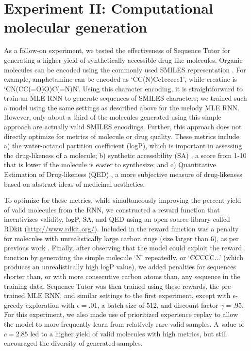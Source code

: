 \section{Experiment II: Computational molecular generation} As a follow-on experiment, we tested the effectiveness of Sequence Tutor for generating a higher yield of synthetically accessible drug-like molecules. Organic molecules can be encoded using the commonly used SMILES representation \cite{weininger1970smiles}. For example, amphetamine can be encoded as `CC(N)Cc1ccccc1', while creatine is `CN(CC(=O)O)C(=N)N'. Using this character encoding, it is straightforward to train an MLE RNN to generate sequences of SMILES characters; we trained such a model using the same settings as described above for the melody MLE RNN. However, only about a third of the molecules generated using this simple approach are actually valid SMILES encodings. Further, this approach does not directly optimize for metrics of molecule or drug quality. These metrics include: a) the water-octanol partition coefficient (logP), which is important in assessing the drug-likeness of a molecule; b) synthetic accessibility (SA) \cite{ertl2009estimation}, a score from 1-10 that is lower if the molecule is easier to synthesize; and c) Quantitative Estimation of Drug-likeness (QED) \cite{bickerton2012quantifying}, a more subjective measure of drug-likeness based on abstract ideas of medicinal aesthetics. 

To optimize for these metrics, while simultaneously improving the percent yield of valid molecules from the RNN, we constructed a reward function that incentivizes validity, logP, SA, and QED using an open-source library called RDkit (\url{http://www.rdkit.org/}). Included in the reward function was a penalty for molecules with unrealistically large carbon rings (size larger than 6), as per previous work \cite{gomez2016automatic}. Finally, after observing that the model could exploit the reward function by generating the simple molecule `N' repeatedly, or `CCCCC...' (which produces an unrealistically high logP value), we added penalties for sequences shorter than, or with more consecutive carbon atoms than, any sequence in the training data. Sequence Tutor was then trained using these rewards, the pre-trained MLE RNN, and similar settings to the first experiment, except with $\epsilon$-greedy exploration with $\epsilon=.01$, a batch size of 512, and discount factor $\gamma=.95$. For this experiment, we also made use of prioritized experience replay \cite{schaul2015prioritized} to allow the model to more frequently learn from relatively rare valid samples. A value of $c=2.85$ led to a higher yield of valid molecules with high metrics, but still encouraged the diversity of generated samples. 

